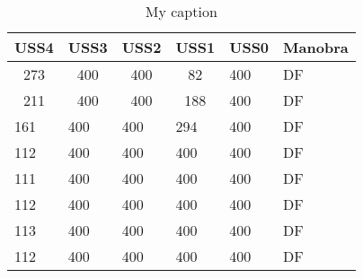 \begin{table}[]
\centering
\caption{My caption}
\label{my-label}
\begin{tabular}{lllll|l|}
\hline
\multicolumn{1}{|c|}{\textbf{USS4}} & \multicolumn{1}{c|}{\textbf{USS3}} & \multicolumn{1}{c|}{\textbf{USS2}} & \multicolumn{1}{c|}{\textbf{USS1}} & 
\multicolumn{1}{c|}{\textbf{USS0}} & \multicolumn{1}{c|}{\textbf{Manobra}} \\ \hline
\multicolumn{1}{c}{273}             & \multicolumn{1}{c}{400}            & \multicolumn{1}{c}{400}            & \multicolumn{1}{c}{82}             & 
400                                & DF                                    \\ \hline
\multicolumn{1}{c}{211}             & \multicolumn{1}{c}{400}            & \multicolumn{1}{c}{400}            & \multicolumn{1}{c}{188}            & 
400                                & DF                                    \\ \hline
161                                 & 400                                & 400                                & 294                                & 
400                                & DF                                    \\ \hline
112                                 & 400                                & 400                                & 400                                & 
400                                & DF                                    \\ \hline
111                                 & 400                                & 400                                & 400                                & 
400                                & DF                                    \\ \hline
112                                 & 400                                & 400                                & 400                                & 
400                                & DF                                    \\ \hline
113                                 & 400                                & 400                                & 400                                & 
400                                & DF                                    \\ \hline
112                                 & 400                                & 400                                & 400                                & 
400                                & DF                                    \\ \hline

\end{tabular}
\end{table}
